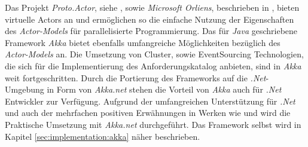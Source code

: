Das Projekt \textit{Proto.Actor}, siehe \cite{Proto.Actor}, sowie \textit{Microsoft Orliens}, beschrieben in \cite{bykov2011orleans}, bieten virtuelle  Actors an und ermöglichen so die einfache Nutzung der Eigenschaften des \textit{Actor-Models} für parallelisierte Programmierung. Das für \textit{Java} geschriebene Framework \textit{Akka} bietet ebenfalls umfangreiche Möglichkeiten bezüglich des \textit{Actor-Models} an. Die Umsetzung von Cluster, sowie EventSourcing Technologien, die sich für die Implementierung des Anforderungskatalog anbieten, sind in \textit{Akka} weit fortgeschritten. Durch die Portierung des Frameworks auf die \textit{.Net}-Umgebung in Form von \textit{Akka.net} stehen die Vorteil von \textit{Akka} auch für \textit{.Net} Entwickler zur Verfügung.
Aufgrund der umfangreichen Unterstützung für \textit{.Net} und auch der  mehrfachen positiven Erwähnungen in Werken wie \cite{Vernon2015ReactiveAkka} und \cite{bernhardt2016reactive} wird die Praktische Umsetzung mit \textit{Akka.net} durchgeführt.
% 
% 
  Das Framework selbst wird in Kapitel \ref{sec:implementation:akka} näher beschrieben. 
